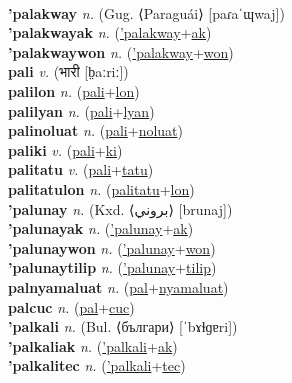  \label{'palasiwtec} \\
\textbf{'palakway} \textit{n.} (Gug. ⟨Paraguái⟩ [paɾaˈɰwaj])
 \label{'palakway} \\
\textbf{'palakwayak} \textit{n.} (\hyperref['palakway]{'palakway}+\hyperref[ak]{ak})
 \label{'palakwayak} \\
\textbf{'palakwaywon} \textit{n.} (\hyperref['palakway]{'palakway}+\hyperref[won]{won})
 \label{'palakwaywon} \\
\textbf{pali} \textit{v.} ({\devanagari{}भारी} [b̤aːriː])
 \label{pali} \\
\textbf{palilon} \textit{n.} (\hyperref[pali]{pali}+\hyperref[lon]{lon})
 \label{palilon} \\
\textbf{palilyan} \textit{n.} (\hyperref[pali]{pali}+\hyperref[lyan]{lyan})
 \label{palilyan} \\
\textbf{palinoluat} \textit{n.} (\hyperref[pali]{pali}+\hyperref[noluat]{noluat})
 \label{palinoluat} \\
\textbf{paliki} \textit{v.} (\hyperref[pali]{pali}+\hyperref[ki]{ki})
 \label{paliki} \\
\textbf{palitatu} \textit{v.} (\hyperref[pali]{pali}+\hyperref[tatu]{tatu})
 \label{palitatu} \\
\textbf{palitatulon} \textit{n.} (\hyperref[palitatu]{palitatu}+\hyperref[lon]{lon})
 \label{palitatulon} \\
\textbf{'palunay} \textit{n.} (Kxd. ⟨بروني⟩ [brunaj])
 \label{'palunay} \\
\textbf{'palunayak} \textit{n.} (\hyperref['palunay]{'palunay}+\hyperref[ak]{ak})
 \label{'palunayak} \\
\textbf{'palunaywon} \textit{n.} (\hyperref['palunay]{'palunay}+\hyperref[won]{won})
 \label{'palunaywon} \\
\textbf{'palunaytilip} \textit{n.} (\hyperref['palunay]{'palunay}+\hyperref[tilip]{tilip})
 \label{'palunaytilip} \\
\textbf{palnyamaluat} \textit{n.} (\hyperref[pal]{pal}+\hyperref[nyamaluat]{nyamaluat})
 \label{palnyamaluat} \\
\textbf{palcuc} \textit{n.} (\hyperref[pal]{pal}+\hyperref[cuc]{cuc})
 \label{palcuc} \\
\textbf{'palkali} \textit{n.} (Bul. ⟨българи⟩ [ˈbɤɫɡɐri])
 \label{'palkali} \\
\textbf{'palkaliak} \textit{n.} (\hyperref['palkali]{'palkali}+\hyperref[ak]{ak})
 \label{'palkaliak} \\
\textbf{'palkalitec} \textit{n.} (\hyperref['palkali]{'palkali}+\hyperref[tec]{tec})

